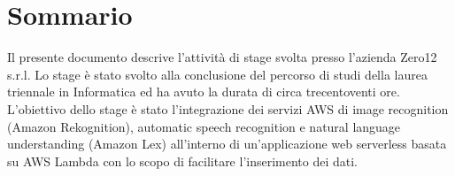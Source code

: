 
\cleardoublepage
{}
{}
\begingroup
\let\clearpage\relax
\let\cleardoublepage\relax
\let\cleardoublepage\relax

\chapter*{Sommario}

Il presente documento descrive l’attività di stage svolta presso l’azienda Zero12 s.r.l. Lo stage è stato svolto alla conclusione del percorso di studi della laurea triennale in Informatica ed ha avuto la durata di circa trecentoventi ore. L’obiettivo dello stage è stato l’integrazione dei servizi AWS di image recognition (Amazon Rekognition), automatic speech recognition e natural language understanding (Amazon Lex) all’interno di un’applicazione web serverless basata su AWS Lambda con lo scopo di facilitare l’inserimento dei dati. 

%
%

\endgroup			

\vfill

